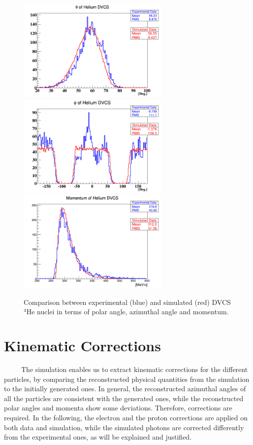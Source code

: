 \begin{figure}[tpb]
   \includegraphics[height=5.0cm]{fig_rtpc/updates/He_theta.png}
   \includegraphics[height=5.0cm]{fig_rtpc/updates/He_phi.png}
   \centering
   \includegraphics[height=5.0cm]{fig_rtpc/updates/He_mom.png}
   \caption{Comparison between experimental (blue) and simulated (red) DVCS 
   $^{4}$He nuclei in terms of polar angle, azimuthal angle and momentum.}
   \label{fig:comp_He}
\end{figure}


\section{Kinematic Corrections}
~~~~~The simulation enables us to extract kinematic corrections for the different particles, by comparing the reconstructed physical quantities from the simulation to the initially generated ones. In general, the reconstructed azimuthal angles of all the particles are consistent with the generated ones, while the reconstructed polar angles and momenta show some deviations. Therefore, corrections are required. In the following, the electron and the proton corrections are applied on both data and simulation, while the simulated photons are corrected differently from the experimental ones, as will be explained and justified. 

